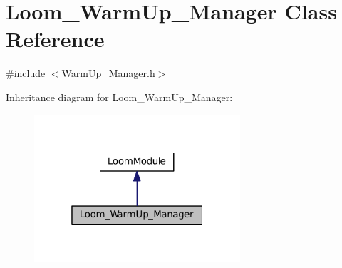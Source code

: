 \hypertarget{class_loom___warm_up___manager}{}\section{Loom\+\_\+\+Warm\+Up\+\_\+\+Manager Class Reference}
\label{class_loom___warm_up___manager}


{\ttfamily \#include $<$Warm\+Up\+\_\+\+Manager.\+h$>$}



Inheritance diagram for Loom\+\_\+\+Warm\+Up\+\_\+\+Manager\+:\nopagebreak
\begin{figure}[H]
\begin{center}
\leavevmode
\includegraphics[width=217pt]{class_loom___warm_up___manager__inherit__graph}
\end{center}
\end{figure}
